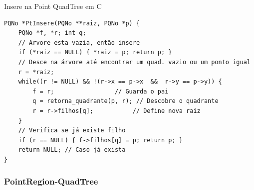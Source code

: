 \documentclass[red, tikz, aspectratio=169, xcolor=dvipsnames]{beamer}
\begin{document}
			\begin{frame}[fragile]{Insere na Point QuadTree em C}
				\begin{verbatim}
PQNo *PtInsere(PQNo **raiz, PQNo *p) {
	PQNo *f, *r; int q;
	// Arvore esta vazia, então insere
	if (*raiz == NULL) { *raiz = p; return p; } 
	// Desce na árvore até encontrar um quad. vazio ou um ponto igual
	r = *raiz;
	while((r != NULL) && !(r->x == p->x  &&  r->y == p->y)) {
		f = r;	               // Guarda o pai 
		q = retorna_quadrante(p, r); // Descobre o quadrante
		r = r->filhos[q];           // Define nova raiz
	}
	// Verifica se já existe filho
	if (r == NULL) { f->filhos[q] = p; return p; }
	return NULL; // Caso já exista
}
				\end{verbatim}
			\end{frame}

		\subsubsection{PointRegion-QuadTree}
\end{document}
